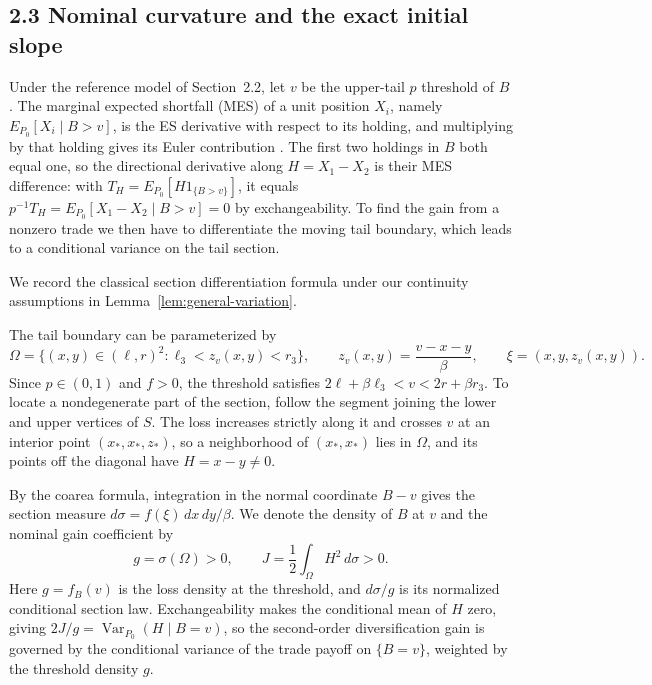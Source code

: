 \subsection{2.3 Nominal curvature and the exact initial slope}\label{sec:nominal-curvature}

Under the reference model of Section~2.2, let \(v\) be the upper-tail \(p\) threshold of \(B\). The marginal expected shortfall (MES) of a unit position \(X_i\), namely \(E_{P_0}[X_i\mid B>v]\), is the ES derivative with respect to its holding, and multiplying by that holding gives its Euler contribution \cite{scaillet2004,tasche2001}. The first two holdings in \(B\) both equal one, so the directional derivative along \(H=X_1-X_2\) is their MES difference: with \(T_H=E_{P_0}[H1_{\{B>v\}}]\), it equals \(p^{-1}T_H=E_{P_0}[X_1-X_2\mid B>v]=0\) by exchangeability. To find the gain from a nonzero trade we then have to differentiate the moving tail boundary, which leads to a conditional variance on the tail section.

We record the classical section differentiation formula under our continuity assumptions in Lemma~\ref{lem:general-variation}.

The tail boundary can be parameterized by
\[
\Omega=\{(x,y)\in(\ell,r)^2:\ell_3<z_v(x,y)<r_3\},\qquad
z_v(x,y)=\frac{v-x-y}{\beta},\qquad
\xi=(x,y,z_v(x,y)).
\]
\leavevmode{}\label{geometry:interior-diagonal}
Since \(p\in(0,1)\) and \(f>0\), the threshold satisfies \(2\ell+\beta\ell_3<v<2r+\beta r_3\). To locate a nondegenerate part of the section, follow the segment joining the lower and upper vertices of \(S\). The loss increases strictly along it and crosses \(v\) at an interior point \((x_*,x_*,z_*)\), so a neighborhood of \((x_*,x_*)\) lies in \(\Omega\), and its points off the diagonal have \(H=x-y\ne0\).

By the coarea formula, integration in the normal coordinate \(B-v\) gives the section measure
\(d\sigma=f(\xi)\,dx\,dy/\beta\). We denote the density of \(B\) at \(v\) and the nominal gain coefficient by
\begin{equation}
g=\sigma(\Omega)>0,\qquad J=\frac12\int_\Omega H^2\,d\sigma>0.
\tag{2.5}\label{eq:2.5}
\end{equation}
Here \(g=f_B(v)\) is the loss density at the threshold, and \(d\sigma/g\) is its normalized conditional section law. Exchangeability makes the conditional mean of \(H\) zero, giving \(2J/g=\operatorname{Var}_{P_0}(H\mid B=v)\), so the second-order diversification gain is governed by the conditional variance of the trade payoff on \(\{B=v\}\), weighted by the threshold density \(g\).


